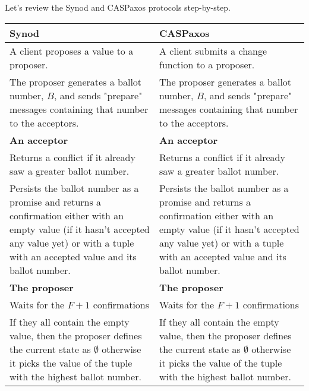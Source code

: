 \documentclass[12pt]{article}
\theoremstyle{definition}
\begin{document}
Let's review the Synod and CASPaxos protocols step-by-step.

\begin{center}
\begin{longtable}{p{15em}|p{15em}} 
  \hline
  {\bf Synod}
  &
  {\bf CASPaxos} \\ 
  \hline
  \endfirsthead

  \endhead
  \endfoot
  \endlastfoot
  
  A client proposes a value to a proposer.
  &
  A client submits a change function to a proposer. \\
  
  \hline
  
  The proposer generates a ballot number, $B$, and sends "prepare" messages containing that number to the acceptors.
  &
  The proposer generates a ballot number, $B$, and sends "prepare" messages containing that number to the acceptors. \\
  
  \hline
  
  {\bf An acceptor}
  &
  {\bf An acceptor} \\[6pt]
  
  
  Returns a conflict if it already saw a greater ballot number.
  &
  Returns a conflict if it already saw a greater ballot number.
  \\[6pt]
  
  
  Persists the ballot number as a promise and returns a confirmation either with an empty value (if it hasn't accepted any value yet) or with a tuple with an accepted value and its ballot number.
  &
  Persists the ballot number as a promise and returns a confirmation either with an empty value (if it hasn't accepted any value yet) or with a tuple with an accepted value and its ballot number.
  \\[6pt]
  
  \hline

  {\bf The proposer}
  &
  {\bf The proposer} \\[6pt]
  

  Waits for the $F+1$ confirmations
  &
  Waits for the $F+1$ confirmations \\[6pt]
  
  
  If they all contain the empty value, then the proposer defines the current state as $\emptyset$ otherwise it picks the value of the tuple with the highest ballot number.
  &
  If they all contain the empty value, then the proposer defines the current state as $\emptyset$ otherwise it picks the value of the tuple with the highest ballot number.
  \\[6pt]
  

\end{longtable}
\end{center}
\end{document}
